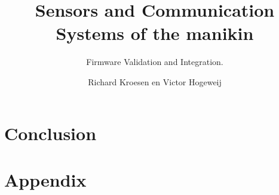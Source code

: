 \documentclass{layout/tudelft-report}
\begin{document}
    \frontmatter

    \title{Sensors and Communication Systems of the manikin}
    \subtitle{Firmware Validation and Integration.}
    \author{Richard Kroesen en Victor Hogeweij}
    \subject{Project Report}

    \makecover
    
    
    
    

    
    
    
    
    \tableofcontents    
    \printnomenclature
    \listoffigures
    \listoftables

    \mainmatter
    

    

    \epigraphhead[650]{}
    
    
    

    \epigraphhead[650]{}
    
    

    \epigraphhead[650]{}
    \part{Conclusion}
    \label{part:closure}

    
    

    \printbibliography[title=References]
    
    \appendix
    \part{Appendix}
    
    
    
    
    
\end{document}
